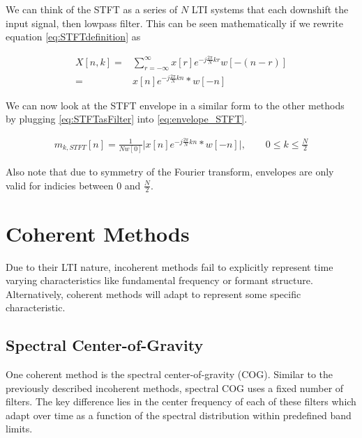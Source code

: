\documentclass [11pt, proquest,oneside] {uwthesis}[2015/03/03]
\begin{document}
We can think of the STFT as a series of $N$ LTI systems that each downshift the input signal, then lowpass filter.  This can be seen mathematically if we rewrite equation \ref{eq:STFTdefinition} as

\begin{align}
X[n,k] =& \sum\limits_{r=-\infty}^{\infty} x[r] e^{-j\frac{2\pi}{N}kr} w[-(n - r)] \nonumber \\
=& x[n] e^{-j\frac{2\pi}{N}kn} * w[-n]
\end{align}

We can now look at the STFT envelope in a similar form to the other methods by plugging \ref{eq:STFTasFilter} into \ref{eq:envelope_STFT}.

\begin{align}
\label{eq:STFT_envelope}
m_{k,STFT}[n] =  \frac{1}{Nw[0]}  \Big\vert x[n] e^{-j\frac{2\pi}{N}kn} * w[-n] \Big\vert, \qquad 0 \leq k \leq \frac{N}{2}
\end{align}

Also note that due to symmetry of the Fourier transform, envelopes are only valid for indicies between $0$ and $\frac{N}{2}$.

\section{Coherent Methods}

Due to their LTI nature, incoherent methods fail to explicitly represent time varying characteristics like fundamental frequency or formant structure. \cite{wilson1993design}  Alternatively, coherent methods will adapt to represent some specific characteristic.



\subsection{Spectral Center-of-Gravity}

One coherent method is the spectral center-of-gravity (COG).  Similar to the previously described incoherent methods, spectral COG uses a fixed number of filters.  The key difference lies in the center frequency of each of these filters which adapt over time as a function of the spectral distribution within predefined band limits.
\end{document}
